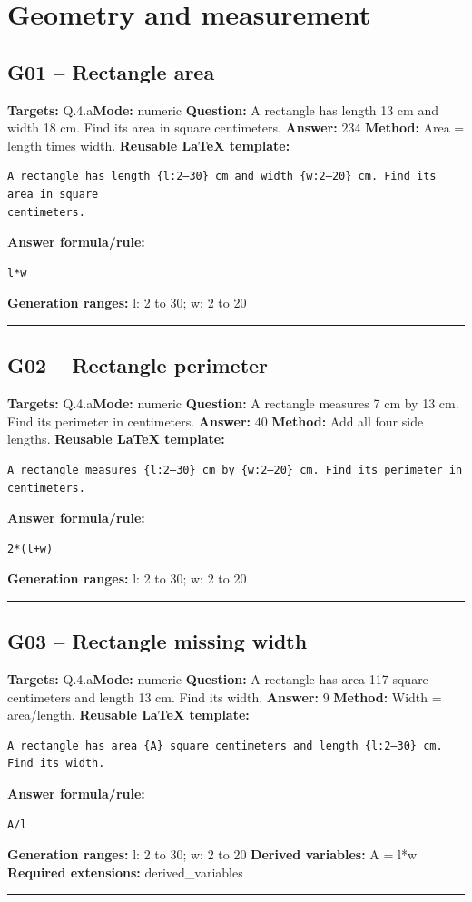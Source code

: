 \documentclass[11pt]{article}
\begin{document}
\section{Geometry and measurement}
\subsection{G01 -- Rectangle area}
\textbf{Targets:} Q.4.a\quad\textbf{Mode:} numeric
\textbf{Question:} A rectangle has length 13 cm and width 18 cm. Find its area in square centimeters.
\textbf{Answer:} \(234\)
\textbf{Method:} Area = length times width.
\textbf{Reusable LaTeX template:}
\begin{verbatim}
A rectangle has length {l:2–30} cm and width {w:2–20} cm. Find its area in square
centimeters.
\end{verbatim}
\textbf{Answer formula/rule:}
\begin{verbatim}
l*w
\end{verbatim}
\textbf{Generation ranges:} l: 2 to 30; w: 2 to 20
\medskip\hrule\medskip
\subsection{G02 -- Rectangle perimeter}
\textbf{Targets:} Q.4.a\quad\textbf{Mode:} numeric
\textbf{Question:} A rectangle measures 7 cm by 13 cm. Find its perimeter in centimeters.
\textbf{Answer:} \(40\)
\textbf{Method:} Add all four side lengths.
\textbf{Reusable LaTeX template:}
\begin{verbatim}
A rectangle measures {l:2–30} cm by {w:2–20} cm. Find its perimeter in centimeters.
\end{verbatim}
\textbf{Answer formula/rule:}
\begin{verbatim}
2*(l+w)
\end{verbatim}
\textbf{Generation ranges:} l: 2 to 30; w: 2 to 20
\medskip\hrule\medskip
\subsection{G03 -- Rectangle missing width}
\textbf{Targets:} Q.4.a\quad\textbf{Mode:} numeric
\textbf{Question:} A rectangle has area 117 square centimeters and length 13 cm. Find its width.
\textbf{Answer:} \(9\)
\textbf{Method:} Width = area/length.
\textbf{Reusable LaTeX template:}
\begin{verbatim}
A rectangle has area {A} square centimeters and length {l:2–30} cm. Find its width.
\end{verbatim}
\textbf{Answer formula/rule:}
\begin{verbatim}
A/l
\end{verbatim}
\textbf{Generation ranges:} l: 2 to 30; w: 2 to 20
\textbf{Derived variables:} A = l*w
\textbf{Required extensions:} derived\_variables
\medskip\hrule\medskip
\end{document}
